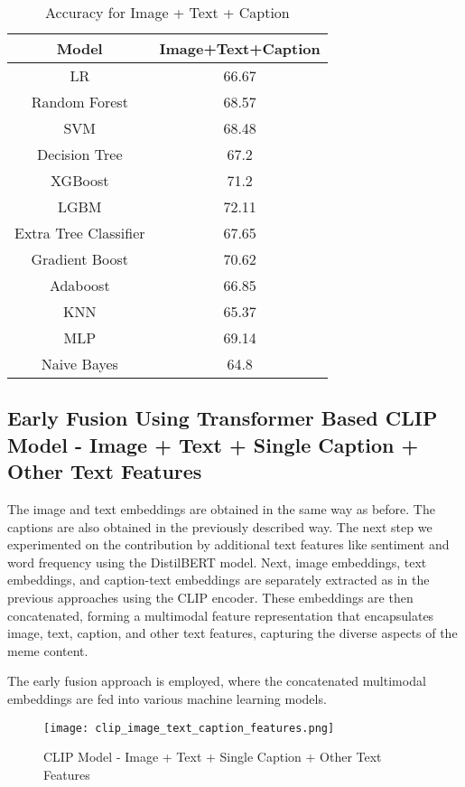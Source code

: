 \documentclass{ieeeaccess}
\begin{document}
\begin{table}[htbp]
\caption{Accuracy for Image + Text + Caption}
\label{tab:image_text_caption_accuracy}
\centering
\begin{tabular}{|c|c|}
\hline
\textbf{Model} & \textbf{Image+Text+Caption} \\
\hline
LR & 66.67 \\
Random Forest & 68.57 \\
SVM & 68.48 \\
Decision Tree & 67.2 \\
XGBoost & 71.2 \\
LGBM & 72.11 \\
Extra Tree Classifier & 67.65 \\
Gradient Boost & 70.62 \\
Adaboost & 66.85 \\
KNN & 65.37 \\
MLP & 69.14 \\
Naive Bayes & 64.8 \\
\hline
\end{tabular}
\end{table}

\subsection{Early Fusion Using Transformer Based CLIP Model - Image + Text + Single Caption + Other Text Features}

The image and text embeddings are obtained in the same way as before. The captions are also obtained in the previously described way. The next step we experimented on the contribution by additional text features like sentiment and word frequency using the DistilBERT model. Next, image embeddings, text embeddings, and caption-text embeddings are separately extracted as in the previous approaches using the CLIP encoder. These embeddings are then concatenated, forming a multimodal feature representation that encapsulates image, text, caption, and other text features, capturing the diverse aspects of the meme content.

The early fusion approach is employed, where the concatenated multimodal embeddings are fed into various machine learning models.

\begin{figure}[htbp]
\centering
\texttt{[image: clip\_image\_text\_caption\_features.png]}
\caption{CLIP Model - Image + Text + Single Caption + Other Text Features}
\label{fig:clip_image_text_caption_features}
\end{figure}
\end{document}
